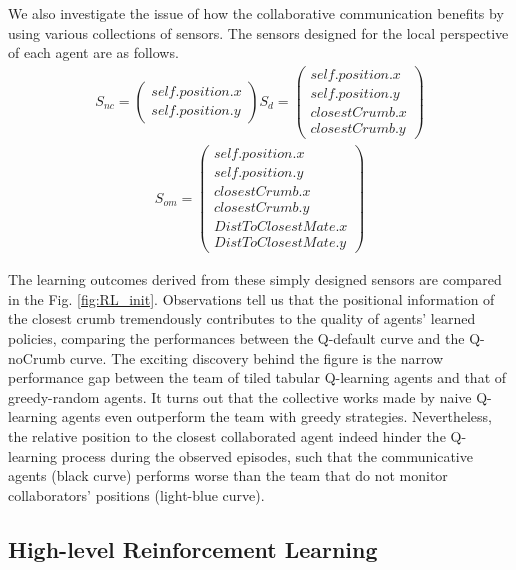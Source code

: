 \documentclass[conference]{IEEEtran}
\begin{document}
We also investigate the issue of how the collaborative communication benefits
by using various collections of sensors.
The sensors designed for the local perspective of each agent are as follows. 
\begin{align}
    S_{nc} = \left( \begin{array}{c}
      self.position.x \\
      self.position.y 
  \end{array} \right)
    S_{d} = \left( \begin{array}{c}
      self.position.x \\
      self.position.y \\
      closestCrumb.x \\
      closestCrumb.y 
  \end{array} \right)
    \nonumber
\end{align}
\begin{align}
        S_{om} = \left( \begin{array}{c}
      self.position.x \\
      self.position.y \\
      closestCrumb.x \\
      closestCrumb.y  \\
      DistToClosestMate.x \\
      DistToClosestMate.y 
  \end{array} \right)
        \nonumber
\end{align}

The learning outcomes derived from these simply designed sensors are compared
in the Fig. \ref{fig:RL_init}. 
Observations tell us that the positional information of the closest crumb
tremendously contributes to the quality of agents' learned policies, comparing
the performances between the Q-default curve and the Q-noCrumb curve. 
 The exciting discovery behind the figure is the narrow performance gap
 between the team of tiled tabular Q-learning agents and that of greedy-random
 agents. It turns out that the collective works made by naive Q-learning
 agents even outperform the team with greedy strategies.
Nevertheless, the relative position to the closest collaborated agent indeed
hinder the Q-learning process during the observed episodes, such that the
communicative agents (black curve) performs worse than the team that do not
monitor collaborators' positions (light-blue curve).

\subsection{High-level Reinforcement Learning}
\end{document}
